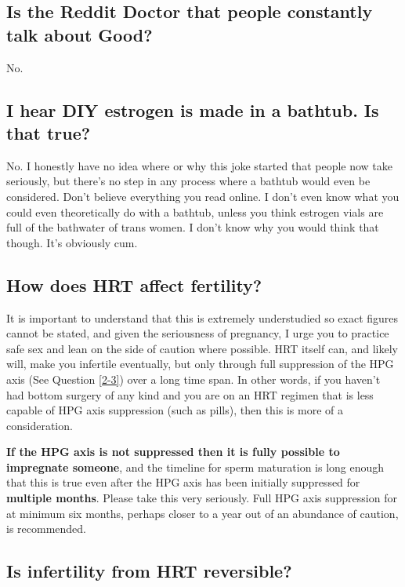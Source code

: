 \documentclass{article}
\begin{document}
{{\subsection{Is the Reddit Doctor that people constantly talk about Good?}

No.

\subsection{I hear DIY estrogen is made in a bathtub. Is that true?}

No. I honestly have no idea where or why this joke started that people now take seriously, but there’s no step in any process where a bathtub would even be considered. Don’t believe everything you read online. I don’t even know what you could even theoretically do with a bathtub, unless you think estrogen vials are full of the bathwater of trans women. I don’t know why you would think that though. It’s obviously cum.

\subsection{How does HRT affect fertility?}\label{11-42}

It is important to understand that this is extremely understudied so exact figures cannot be stated, and given the seriousness of pregnancy, I urge you to practice safe sex and lean on the side of caution where possible. HRT itself can, and likely will, make you infertile eventually, but only through full suppression of the HPG axis (See Question \ref{2-3}) over a long time span. In other words, if you haven't had bottom surgery of any kind and you are on an HRT regimen that is less capable of HPG axis suppression (such as pills), then this is more of a consideration.

\textbf{If the HPG axis is not suppressed then it is fully possible to impregnate someone}, and the timeline for sperm maturation is long enough that this is true even after the HPG axis has been initially suppressed for \textbf{multiple months}. Please take this very seriously. Full HPG axis suppression for at minimum six months, perhaps closer to a year out of an abundance of caution, is recommended.

\subsection{Is infertility from HRT reversible?}\label{11-43}

}}
\end{document}
